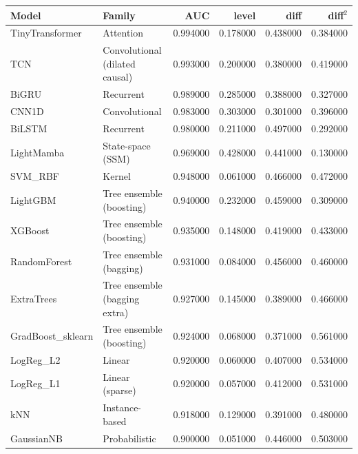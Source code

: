 \begin{tabular}{llrrrr}
\toprule
Model & Family & AUC & level & diff & diff$^2$ \\
\midrule
TinyTransformer & Attention & 0.994000 & 0.178000 & 0.438000 & 0.384000 \\
TCN & Convolutional (dilated causal) & 0.993000 & 0.200000 & 0.380000 & 0.419000 \\
BiGRU & Recurrent & 0.989000 & 0.285000 & 0.388000 & 0.327000 \\
CNN1D & Convolutional & 0.983000 & 0.303000 & 0.301000 & 0.396000 \\
BiLSTM & Recurrent & 0.980000 & 0.211000 & 0.497000 & 0.292000 \\
LightMamba & State-space (SSM) & 0.969000 & 0.428000 & 0.441000 & 0.130000 \\
SVM_RBF & Kernel & 0.948000 & 0.061000 & 0.466000 & 0.472000 \\
LightGBM & Tree ensemble (boosting) & 0.940000 & 0.232000 & 0.459000 & 0.309000 \\
XGBoost & Tree ensemble (boosting) & 0.935000 & 0.148000 & 0.419000 & 0.433000 \\
RandomForest & Tree ensemble (bagging) & 0.931000 & 0.084000 & 0.456000 & 0.460000 \\
ExtraTrees & Tree ensemble (bagging extra) & 0.927000 & 0.145000 & 0.389000 & 0.466000 \\
GradBoost_sklearn & Tree ensemble (boosting) & 0.924000 & 0.068000 & 0.371000 & 0.561000 \\
LogReg_L2 & Linear & 0.920000 & 0.060000 & 0.407000 & 0.534000 \\
LogReg_L1 & Linear (sparse) & 0.920000 & 0.057000 & 0.412000 & 0.531000 \\
kNN & Instance-based & 0.918000 & 0.129000 & 0.391000 & 0.480000 \\
GaussianNB & Probabilistic & 0.900000 & 0.051000 & 0.446000 & 0.503000 \\
\bottomrule
\end{tabular}
